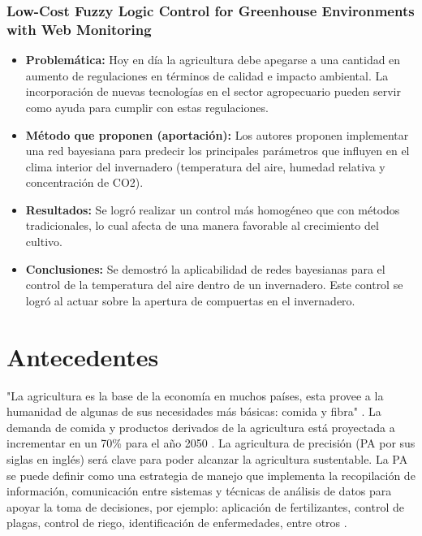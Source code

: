 \documentclass[final,12pt]{article}
\begin{document}
\subsubsection{Low-Cost Fuzzy Logic Control for Greenhouse Environments with Web Monitoring}
\begin{itemize}
    \item \textbf{Problemática: }
    Hoy en día la agricultura debe apegarse a una cantidad en aumento de regulaciones en términos de calidad e impacto ambiental.
	La incorporación de nuevas tecnologías en el sector agropecuario pueden servir como ayuda para cumplir con estas regulaciones.
    \item \textbf{Método que proponen (aportación): }
    Los autores proponen implementar una red bayesiana para predecir los principales parámetros que influyen en el clima interior del invernadero 
	(temperatura del aire, humedad relativa y concentración de CO2).
    \item \textbf{Resultados: }
    Se logró realizar un control más homogéneo que con métodos tradicionales, lo cual afecta de una manera favorable al crecimiento del cultivo.
    \item \textbf{Conclusiones:}
    Se demostró la aplicabilidad de redes bayesianas para el control de la temperatura del aire dentro de un invernadero. Este control se logró
	al actuar sobre la apertura de compuertas en el invernadero.
\end{itemize}

\newpage
\section{Antecedentes}

"La agricultura es la base de la economía en muchos países, esta provee a la humanidad de algunas de sus necesidades más básicas: comida y fibra" \cite{appsremotesensing}. 
La demanda de comida y productos derivados de la agricultura está proyectada a incrementar en un 70\% para el año 2050 \cite{wik_pingali_brocai_2008}. 
La agricultura de precisión (PA por sus siglas en inglés) será clave para poder alcanzar la agricultura sustentable. La PA se puede definir como una 
estrategia de manejo que implementa la recopilación de información, comunicación entre sistemas y técnicas de análisis de datos para apoyar la toma 
de decisiones, por ejemplo: aplicación de fertilizantes, control de plagas, control de riego, identificación de enfermedades, entre otros \cite{appsremotesensing}.
\end{document}
